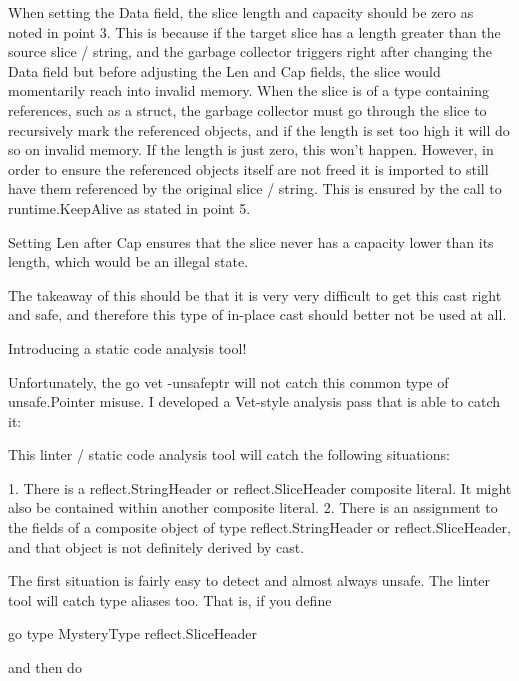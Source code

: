         When setting the Data field, the slice length and capacity should be zero as noted in point 3. This is because if the
        target slice has a length greater than the source slice / string, and the garbage collector triggers right after
        changing the Data field but before adjusting the Len and Cap fields, the slice would momentarily reach into
        invalid memory. When the slice is of a type containing references, such as a struct, the garbage collector must go
        through the slice to recursively mark the referenced objects, and if the length is set too high it will do so on invalid
        memory. If the length is just zero, this won't happen. However, in order to ensure the referenced objects itself are not
        freed it is imported to still have them referenced by the original slice / string. This is ensured by the call to
        runtime.KeepAlive as stated in point 5.

        Setting Len after Cap ensures that the slice never has a capacity lower than its length, which would be an illegal
        state.

        The takeaway of this should be that it is very very difficult to get this cast right and safe, and therefore this type
        of in-place cast should better not be used at all.


        Introducing a static code analysis tool!

        Unfortunately, the go vet -unsafeptr will not catch this common type of unsafe.Pointer misuse. I developed a Vet-style
        analysis pass that is able to catch it:


        This linter / static code analysis tool will catch the following situations:

        1. There is a reflect.StringHeader or reflect.SliceHeader composite literal. It might also be contained within
        another composite literal.
        2. There is an assignment to the fields of a composite object of type reflect.StringHeader or reflect.SliceHeader,
        and that object is not definitely derived by cast.

        The first situation is fairly easy to detect and almost always unsafe. The linter tool will catch type aliases too. That
        is, if you define

        go
        type MysteryType reflect.SliceHeader


        and then do

